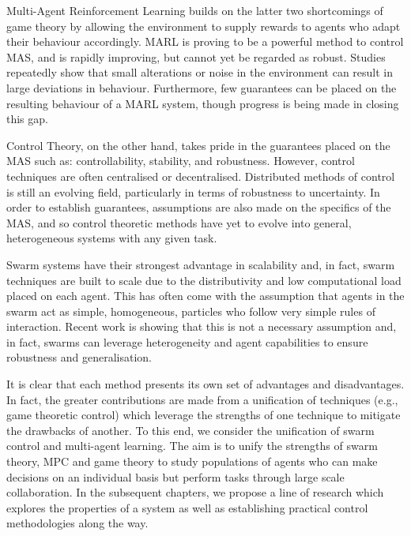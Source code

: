 \documentclass[.../main.tex]{subfiles}
\begin{document}
Multi-Agent Reinforcement Learning builds on the latter two
shortcomings of game theory by allowing the environment to supply
rewards to agents who adapt their behaviour accordingly. MARL is
proving to be a powerful method to control MAS, and is rapidly
improving, but cannot yet be regarded as robust. Studies repeatedly
show that small alterations or noise in the environment can result in
large deviations in behaviour. Furthermore, few guarantees can be
placed on the resulting behaviour of a MARL system, though progress is
being made in closing this gap.

Control Theory, on the other hand, takes pride in the guarantees
placed on the MAS such as: controllability, stability, and
robustness. However, control techniques are often centralised or
decentralised. Distributed methods of control is still an evolving
field, particularly in terms of robustness to uncertainty. In order to
establish guarantees, assumptions are also made on the specifics of
the MAS, and so control theoretic methods have yet to evolve into
general, heterogeneous systems with any given task.

Swarm systems have their strongest advantage in scalability and, in
fact, swarm techniques are built to scale due to the distributivity
and low computational load placed on each agent. This has often come
with the assumption that agents in the swarm act as simple,
homogeneous, particles who follow very simple rules of
interaction. Recent work is showing that this is not a necessary
assumption and, in fact, swarms can leverage heterogeneity and agent
capabilities to ensure robustness and generalisation.

It is clear that each method presents its own set of advantages and
disadvantages. In fact, the greater contributions are made from a
unification of techniques (e.g., game theoretic control) which leverage
the strengths of one technique to mitigate the drawbacks of
another. To this end, we consider the unification of swarm control and
multi-agent learning. The aim is to unify the strengths of swarm
theory, MPC and game theory to study populations of agents who can
make decisions on an individual basis but perform tasks through large
scale collaboration. In the subsequent chapters, we propose a line of
research which explores the properties of a system as well as
establishing practical control methodologies along the way.
\end{document}
